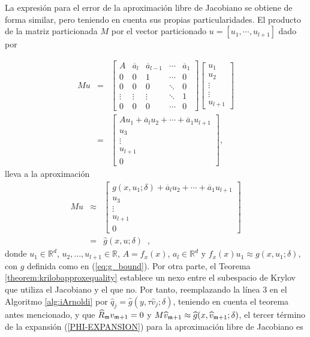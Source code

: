 La expresión para el error de la aproximación libre de Jacobiano se obtiene de forma similar, pero teniendo en cuenta sus propias particularidades. El producto de la matriz particionada $M$ por el vector particionado $u=[u_1,\cdots , u_{l+1}]$ dado por

\begin{eqnarray*}
	Mu & = & \left[ 
	\begin{array}{ccccc}
		A & \overline{a}_{l} & \overline{a}_{l-1} & \cdots  & \overline{a}_{1} \\ 
		0 & 0 & 1 & \cdots  & 0 \\ 
		0 & 0 & 0 & \ddots  & 0 \\ 
		\vdots  & \vdots  & \vdots  & \ddots  & 1 \\ 
		0 & 0 & 0 & \cdots  & 0
	\end{array}
	\right] \left[ 
	\begin{array}{c}
		u_{1} \\ 
		u_{2} \\ 
		\vdots  \\ 
		\vdots  \\ 
		u_{l+1}
	\end{array}
	\right]  \\
	& = & 	\left[ 
	\begin{array}{c}
		Au_{1}+\overline{a}_{l}u_{2}+\cdots +\overline{a}_{1}u_{l+1} \\ 
		u_{3} \\ 
		\vdots  \\ 
		u_{l+1} \\ 
		0
	\end{array}
	\right] ,
\end{eqnarray*}
lleva a la aproximación 
\begin{eqnarray*}
Mu	& \approx &  	\left[ 
	\begin{array}{c}
		g(x,u_1;\delta)+\overline{a}_{l}u_{2}+\cdots +\overline{a}_{1}u_{l+1} \\ 
		u_{3} \\ 
		\vdots  \\ 
		u_{l+1} \\ 
		0
	\end{array}
	\right] \\
	& = &
	\widehat{g}(x,u;\delta)\;\;,
\end{eqnarray*}
donde $u_1\in\mathbb{R}^{d}$, $u_2,\ldots,u_{l+1}\in\mathbb{R}$, $A=f_x(x)$, $a_l\in \mathbb{R}^d$ y $f_x(x)u_1\approx g(x,u_1;\delta)$, con $g$ definida como en (\ref{eq:g_bound}). Por otra parte, el Teorema \ref{theorem:krilobapproxequality} establece un nexo entre el subespacio de Krylov que utiliza el Jacobiano y el que no. Por tanto, reemplazando la línea 3  en el Algoritmo \ref{alg:iArnoldi}  por $\widehat{q}_j=\widehat{g}(y,\tau \widehat{v}_j;\delta)$, teniendo en cuenta el teorema antes mencionado, y que $\widehat{R}_{\mathfrak{m}} v_{\mathfrak{m}+1}=0$ y $M\widehat{v}_{\mathfrak{m}+1}\approx \widehat{g}(x,\widehat{v}_{\mathfrak{m}+1};\delta)$, el tercer término de la expansión (\ref{PHI-EXPANSION}) para la aproximación libre de Jacobiano es
